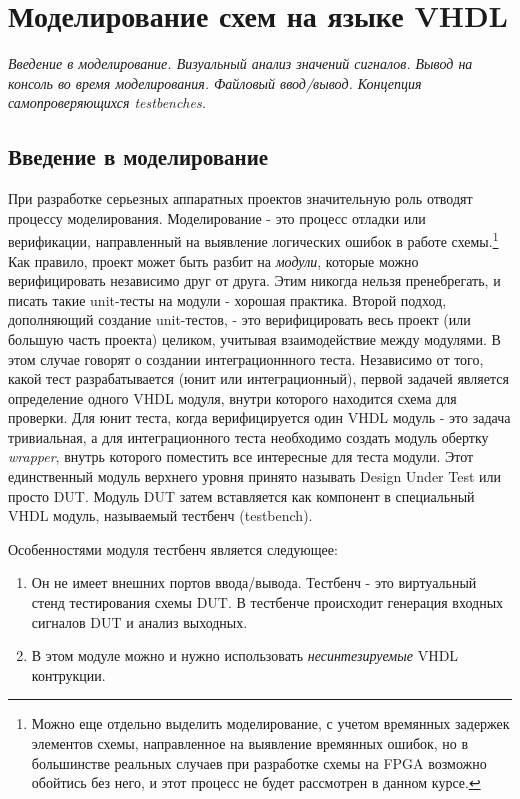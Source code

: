 \chapter{Моделирование схем на языке VHDL}

\emph{Введение в моделирование. Визуальный анализ значений сигналов. Вывод на консоль во время моделирования. Файловый ввод/вывод. Концепция самопроверяющихся testbenches.}

\section{Введение в моделирование}

При разработке серьезных аппаратных проектов значительную роль отводят процессу моделирования. Моделирование - это процесс отладки или верификации, направленный на выявление логических ошибок в работе схемы.\footnote{Можно еще отдельно выделить моделирование, с учетом времянных задержек элементов схемы, направленное на выявление времянных ошибок, но в большинстве реальных случаев при разработке схемы на FPGA возможно обойтись без него, и этот процесс не будет рассмотрен в данном курсе.} Как правило, проект может быть разбит на \emph{модули}, которые можно верифицировать независимо друг от друга. Этим никогда нельзя пренебрегать, и писать такие unit-тесты на модули - хорошая практика. Второй подход, дополняющий создание unit-тестов, - это верифицировать весь проект (или большую часть проекта) целиком, учитывая взаимодействие между модулями. В этом случае говорят о создании интеграционнного теста.
Независимо от того, какой тест разрабатывается (юнит или интеграционный), первой задачей является определение одного VHDL модуля, внутри которого находится схема для проверки. Для юнит теста, когда верифицируется один VHDL модуль - это задача тривиальная, а для интеграционного теста необходимо создать модуль обертку \emph{wrapper}, внутрь которого поместить все интересные для теста модули. Этот единственный модуль верхнего уровня принято называть Design Under Test или просто DUT.
Модуль DUT затем вставляется как компонент в специальный VHDL модуль, называемый тестбенч (testbench).

Особенностями модуля тестбенч является следующее:
\begin{enumerate}
\item Он не имеет внешних портов ввода/вывода. Тестбенч - это виртуальный стенд тестирования схемы DUT. В тестбенче происходит генерация входных сигналов DUT и анализ выходных.
\item В этом модуле можно и нужно использовать \emph{несинтезируемые} VHDL контрукции.
\end{enumerate}

